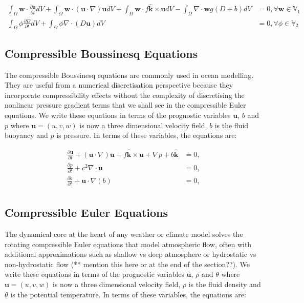 \documentclass[11pt, a4paper]{article}
\def\MM#1{\boldsymbol{#1}}
\newcommand{\pp}[2]{\frac{\partial #1}{\partial #2}}
\begin{document}
\begin{align}
  \int_\Omega\MM{w}\cdot\pp{\MM{u}}{t}dV + \int_\Omega\MM{w}\cdot(\MM{u}\cdot\nabla)\MM{u} dV + \int_\Omega\MM{w}\cdot f\hat{\MM{k}}\times\MM{u}dV - \int_\Omega \nabla\cdot\MM{w} g(D+b) dV &= 0, \forall \MM{w}\in\mathbb{V}_1 \\
  \int_\Omega\phi\pp{D}{t}dV + \int_\Omega\phi\nabla\cdot(D\MM{u}) dV &= 0, \forall \phi\in\mathbb{V}_2
\end{align}

\subsection{Compressible Boussinesq Equations}
The compressible Boussinesq equations are commonly used in ocean
modelling. They are useful from a numerical discretisation perspective
because they incorporate compressibility effects without the
complexity of discretising the nonlinear pressure gradient terms that
we shall see in the compressible Euler equations. We write these
equations in terms of the prognostic variables $\MM{u}$, $b$ and
$p$ where $\MM{u}=(u, v, w)$ is now a three dimensional velocity
field, $b$ is the fluid buoyancy and $p$ is pressure. In terms of
these variables, the equations are:

\begin{align}
  \pp{\MM{u}}{t} + 
  (\MM{u}\cdot\nabla)\MM{u} +
  f\hat{\MM{k}}\times \MM{u} + \nabla p + b\hat{\MM{k}} & = 0, \\
  \pp{p}{t} + c^2\nabla\cdot\MM{u} & = 0, \\
  \pp{b}{t} + \MM{u}\cdot\nabla(b) & = 0, \\
\end{align}

\subsection{Compressible Euler Equations}
The dynamical core at the heart of any weather or climate model solves
the rotating compressible Euler equations that model atmospheric flow,
often with additional approximations such as shallow vs deep
atmosphere or hydrostatic vs non-hydrostatic flow (** mention this
here or at the end of the section??). We write these equations in
terms of the prognostic variables $\MM{u}$, $\rho$ and $\theta$ where
$\MM{u}=(u, v, w)$ is now a three dimensional velocity field, $\rho$
is the fluid density and $\theta$ is the potential temperature. In
terms of these variables, the equations are:
\end{document}
